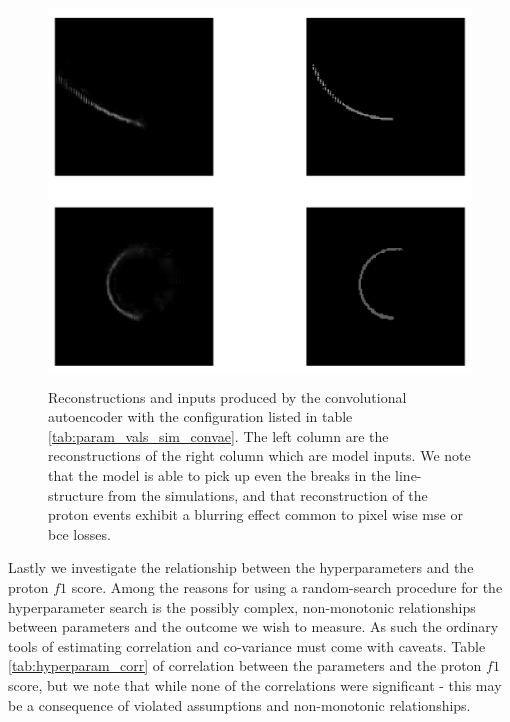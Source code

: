 \begin{figure}
\includegraphics[width=\textwidth, height=4in]{plots/convae_reconstruction.png}
\caption{Reconstructions and inputs produced by the convolutional autoencoder with the configuration listed in table \ref{tab:param_vals_sim_convae}. The left column are the reconstructions of the right column which are model inputs. We note that the model is able to pick up even the breaks in the line-structure from the simulations, and that reconstruction of the proton events exhibit a blurring effect common to pixel wise mse or bce losses.}\label{fig:sim_convae_reconstruction}
\end{figure}

Lastly we investigate the relationship between the hyperparameters and the proton $f1$ score. Among the reasons for using a random-search procedure for the hyperparameter search is the possibly complex, non-monotonic relationships between parameters and the outcome we wish to measure. As such the ordinary tools of estimating correlation and co-variance must come with caveats. Table \ref{tab:hyperparam_corr} of correlation between the parameters and the proton $f1$ score, but we note that while none of the correlations were significant - this may be a consequence of violated assumptions and non-monotonic relationships.

